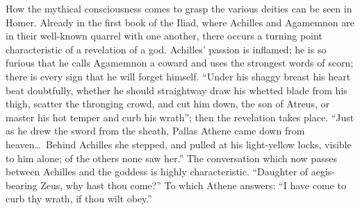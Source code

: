\documentclass[12pt]{book}
\newcommand{\opage}[1]{\marginnote{\footnotesize\textit{[#1]}}}
\begin{document}
How the mythical consciousness comes to grasp the various deities can be
seen in Homer. Already in the first book of the Iliad, where Achilles
and Agamemnon are in their well-known quarrel with one another, there
occurs a turning point characteristic of a revelation of a god.
Achilles' passion is inflamed; he is so furious that he calls Agamemnon
a coward and uses the strongest words of scorn; there is every sign that
he will forget himself. ``Under his shaggy breast his heart beat
doubtfully, whether he should straightway draw his whetted blade from
his thigh, scatter the thronging crowd, and cut
\opage{93}\setcounter{footnote}{0}%
him down, the son of Atreus, or master his hot temper and curb his
wrath''; then the revelation takes place. ``Just as he drew the sword
from the sheath, Pallas Athene came down from heaven\dots\ Behind
Achilles she stepped, and pulled at his light-yellow locks, visible to
him alone; of the others none saw her.'' The conversation which now
passes between Achilles and the goddess is highly characteristic.
``Daughter of aegis-bearing Zeus, why hast thou come?'' To which Athene
answers: ``I have come to curb thy wrath, if thou wilt obey.''
\end{document}
